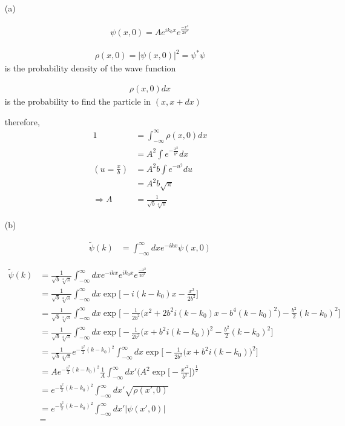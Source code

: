 \documentclass[11pt,a4paper]{article}
\begin{document}
\begin{enumerate}
\item[(a)]

\begin{align}
    \psi(x,0)=Ae^{ik_0x}e^{\frac{-x^2}{2b^2}}
\end{align}

\begin{align}
    \rho(x,0)=|\psi(x,0)|^2=\psi^*\psi
\end{align}
is the probability density of the wave function

\begin{align}
    \rho(x,0)dx
\end{align}
is the probability to find the particle in $(x,x+dx)$

therefore,
    \begin{align}
    1&=\int_{-\infty}^\infty\rho(x,0)dx\\
    &=A^2\int e^{-\frac{x^2}{b^2}}dx\\
    (u=\frac{x}{b})&=A^2b\int e^{-u^2}du\\
    &=A^2b\sqrt{\pi}\\
    \Rightarrow A&=\frac{1}{\sqrt{b}\sqrt[4]{\pi}}
\end{align}

\item[(b)]

\begin{align}
    \tilde{\psi}(k)&=\int^\infty_{-\infty} dx e^{-ikx}\psi(x,0)
\end{align}

\begin{align}
    \tilde{\psi}(k)
    &=\frac{1}{\sqrt{b}\sqrt[4]{\pi}}\int^\infty_{-\infty} dx e^{-ikx}e^{ik_0x}e^{\frac{-x^2}{2b^2}}\\
    &=\frac{1}{\sqrt{b}\sqrt[4]{\pi}}\int^\infty_{-\infty} dx \exp{\bigg[-i(k-k_0)x-\frac{x^2}{2b^2}\bigg]}\\
    &=\frac{1}{\sqrt{b}\sqrt[4]{\pi}}\int^\infty_{-\infty} dx \exp{\bigg[-\frac{1}{2b^2}\Big(x^2+2b^2i(k-k_0)x-b^4(k-k_0)^2\Big)-\frac{b^2}{2}(k-k_0)^2\bigg]}\\
    &=\frac{1}{\sqrt{b}\sqrt[4]{\pi}}\int^\infty_{-\infty} dx \exp{\bigg[-\frac{1}{2b^2}\Big(x+b^2i(k-k_0)\Big)^2-\frac{b^2}{2}(k-k_0)^2\bigg]}\\
    &=\frac{1}{\sqrt{b}\sqrt[4]{\pi}}e^{-\frac{b^2}{2}(k-k_0)^2}\int^\infty_{-\infty} dx \exp{\bigg[-\frac{1}{2b^2}\Big(x+b^2i(k-k_0)\Big)^2\bigg]}\\
    &=Ae^{-\frac{b^2}{2}(k-k_0)^2}\frac{1}{A}\int^\infty_{-\infty} dx' \Bigg(A^2\exp{\bigg[-\frac{x'^2}{b^2}\bigg]}\Bigg)^\frac{1}{2}\\
    &=e^{-\frac{b^2}{2}(k-k_0)^2}\int^\infty_{-\infty} dx' \sqrt{\rho(x',0)}\\
    &=e^{-\frac{b^2}{2}(k-k_0)^2}\int^\infty_{-\infty} dx' |\psi(x',0)|\\
    &=
\end{align}


\end{enumerate}
\end{document}
